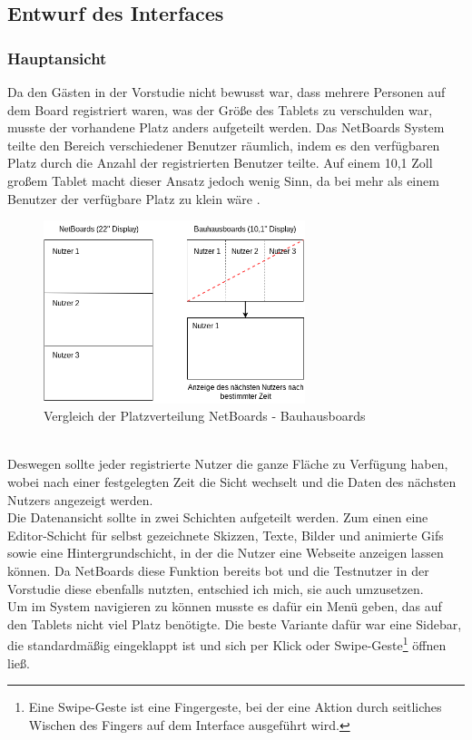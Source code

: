 \subsection{Entwurf des Interfaces}\label{Entwurf des Interfaces}
\subsubsection{Hauptansicht}\label{Hauptansicht}
Da den Gästen in der Vorstudie nicht bewusst war, dass mehrere Personen auf dem Board registriert waren, was der Größe des Tablets zu verschulden war, musste der vorhandene Platz anders aufgeteilt werden. Das NetBoards System teilte den Bereich verschiedener Benutzer räumlich, indem es den verfügbaren Platz durch die Anzahl der registrierten Benutzer teilte.
Auf einem 10,1 Zoll großem Tablet macht dieser Ansatz jedoch wenig Sinn, da bei mehr als einem Benutzer der verfügbare Platz zu klein wäre .
\begin{figure}[h!]
  \centering
    \includegraphics[width=0.68\textwidth]{./img/AufteilungMainView.png}
  \caption{Vergleich der Platzverteilung NetBoards - Bauhausboards}
  \label{img:aufteilungMainView}
\end{figure}
\\
Deswegen sollte jeder registrierte Nutzer die ganze Fläche zu Verfügung haben, wobei nach einer festgelegten Zeit die Sicht wechselt und die Daten des nächsten Nutzers angezeigt werden.
\\
Die Datenansicht sollte in zwei Schichten aufgeteilt werden. Zum einen eine Editor-Schicht für selbst gezeichnete Skizzen, Texte, Bilder und animierte Gifs sowie eine Hintergrundschicht, in der die Nutzer eine Webseite anzeigen lassen können. Da NetBoards diese Funktion bereits bot und die Testnutzer in der Vorstudie diese ebenfalls nutzten, entschied ich mich, sie auch umzusetzen.
\\
Um im System navigieren zu können musste es dafür ein Menü geben, das auf den Tablets nicht viel Platz benötigte. Die beste Variante dafür war eine Sidebar, die standardmäßig eingeklappt ist und sich per Klick oder Swipe-Geste\footnote{Eine Swipe-Geste ist eine Fingergeste, bei der eine Aktion durch seitliches Wischen des Fingers auf dem Interface ausgeführt wird.} öffnen ließ.
